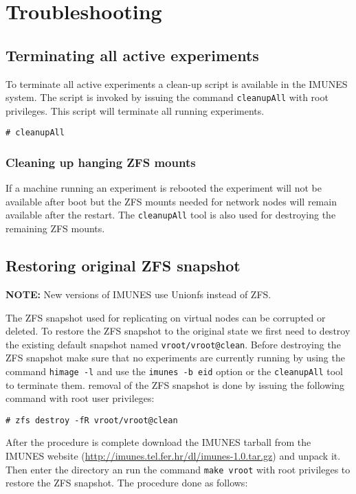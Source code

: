 \chapter{Troubleshooting}

\section{Terminating all active experiments}

To terminate all active experiments a clean-up script is available in the IMUNES
system. The script is invoked by issuing the command \texttt{cleanupAll} with
root privileges. This script will terminate all running experiments.

\texttt{\# cleanupAll}

\subsection{Cleaning up hanging ZFS mounts}

If a machine running an experiment is rebooted the experiment will not be
available after boot but the ZFS mounts needed for network nodes will remain
available after the restart. The \texttt{cleanupAll} tool is also used for
destroying the remaining ZFS mounts. 

\section{Restoring original ZFS snapshot}
\textbf{NOTE:} New versions of IMUNES use Unionfs instead of ZFS.

The ZFS snapshot used for replicating on virtual nodes can be corrupted or
deleted. To restore the ZFS snapshot to the original state we first need to
destroy the existing default snapshot named \texttt{vroot/vroot@clean}. Before
destroying the ZFS snapshot make sure that no experiments are currently running
by using the command \texttt{himage -l} and use the \texttt{imunes -b eid}
option or the \texttt{cleanupAll} tool to terminate them.  removal of the ZFS
snapshot is done by issuing the following command with root user privileges:

\texttt{\# zfs destroy -fR vroot/vroot@clean}

After the procedure is complete download the IMUNES tarball from the IMUNES
website (\url{http://imunes.tel.fer.hr/dl/imunes-1.0.tar.gz}) and unpack it.
Then enter the directory an run the command \texttt{make vroot} with root
privileges to restore the ZFS snapshot. The procedure done as follows:

